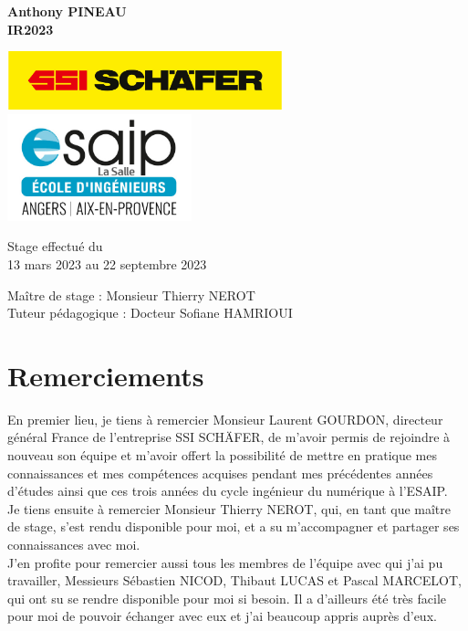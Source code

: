 \documentclass[a4paper, 12pt, french]{article}
\begin{document}
\begin{titlepage}
\begin{center}
			\textbf{Anthony PINEAU}\\
			\textbf{IR2023}

			\vfill

			\includegraphics[width=0.6\textwidth]{images/schaefer.jpg}
			\vfill
			\includegraphics[width=0.4\textwidth]{images/esaip.jpg}

			\vfill

			Stage effectué du\\
			13 mars 2023 au 22 septembre 2023

			\vspace{0.8cm}
			
			\Large
			Maître de stage : Monsieur Thierry NEROT\\
			Tuteur pédagogique : Docteur Sofiane HAMRIOUI\\
		\end{center}
	\end{titlepage}
		
	\newpage

	\footnotesize
	\section*{Remerciements}		
	En premier lieu, je tiens à remercier Monsieur Laurent GOURDON, directeur général France de l'entreprise SSI SCHÄFER, de m’avoir permis de rejoindre à nouveau son équipe et m’avoir offert la possibilité de mettre en pratique mes connaissances et mes compétences acquises pendant mes précédentes années d’études ainsi que ces trois années du cycle ingénieur du numérique à l’ESAIP. \\

	Je tiens ensuite à remercier Monsieur Thierry NEROT, qui, en tant que maître de stage, s'est rendu disponible pour moi, et a su m'accompagner et partager ses connaissances avec moi.\\

	J’en profite pour remercier aussi tous les membres de l’équipe avec qui j’ai pu travailler, Messieurs Sébastien NICOD, Thibaut LUCAS et Pascal MARCELOT, qui ont su se rendre disponible pour moi si besoin. Il a d'ailleurs été très facile pour moi de pouvoir échanger avec eux et j'ai beaucoup appris auprès d'eux.\\
\end{document}
